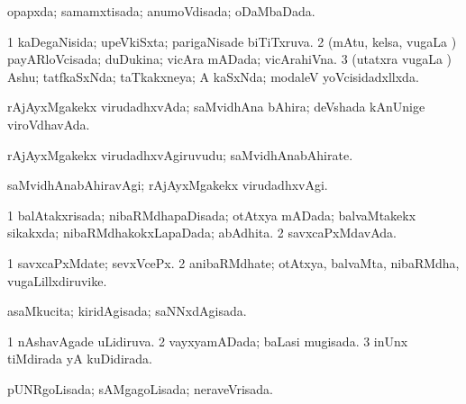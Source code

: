 {\bentry
{} 
\gl{\gu}
\expl{}
\bmng
 opapxda; samamxtisada; anumoVdisada; oDaMbaDada. 
\emng
\eentry

\bentry
{} 
\gl{\gu}
\expl{}
\bmng
\bnum
\num{1} kaDegaNisida; upeVkiSxta; parigaNisade biTiTxruva. 
\num{2} (mAtu, kelsa, \mo vugaLa \vi) payARloVcisada; duDukina; vicAra mADada; vicArahiVna. 
\num{3} (utatxra \mo vugaLa \vi) Ashu; tatfkaSxNda; taTkakxneya; A kaSxNda; modaleV yoVcisidadxllxda. 
\enum
\emng
\eentry

\bentry
{} 
\gl{\gu}
\expl{}
\bmng
\emng
\eentry

\bentry
{} 
\gl{\kirxvi}
\expl{}
\bmng
{} 
\emng
\eentry

\bentry
{} 
\gl{\gu}
\expl{}
\bmng
 rAjAyxMgakekx virudadhxvAda; saMvidhAna bAhira; deVshada kAnUnige viroVdhavAda. 
\emng
\eentry

\bentry
{} 
\gl{\nA}
\expl{}
\bmng
 rAjAyxMgakekx virudadhxvAgiruvudu; saMvidhAnabAhirate. 
\emng
\eentry

\bentry
{} 
\gl{\kirxvi}
\expl{}
\bmng
 saMvidhAnabAhiravAgi; rAjAyxMgakekx virudadhxvAgi. 
\emng
\eentry

\bentry
{} 
\gl{\gu}
\expl{}
\bmng
\bnum
\num{1} balAtakxrisada; nibaRMdhapaDisada; otAtxya mADada; balvaMtakekx sikakxda; nibaRMdhakokxLapaDada; abAdhita. 
\num{2} savxcaPxMdavAda. 
\enum
\emng
\eentry

\bentry
{} 
\gl{\nA}
\expl{}
\bmng
\bnum
\num{1} savxcaPxMdate; sevxVcePx. 
\num{2} anibaRMdhate; otAtxya, balvaMta, nibaRMdha, \mo vugaLillxdiruvike. 
\enum
\emng
\eentry

\bentry
{} 
\gl{\gu}
\expl{}
\bmng
 asaMkucita; kiridAgisada; saNNxdAgisada. 
\emng
\eentry

\bentry
{} 
\gl{\gu}
\expl{}
\bmng
\bnum
\num{1} nAshavAgade uLidiruva. 
\num{2} vayxyamADada; baLasi mugisada. 
\num{3} inUnx tiMdirada yA kuDidirada. 
\enum
\emng
\eentry

\bentry
{} 
\gl{\gu}
\expl{}
\bmng
 pUNRgoLisada; sAMgagoLisada; neraveVrisada. 
\emng
\eentry

}
